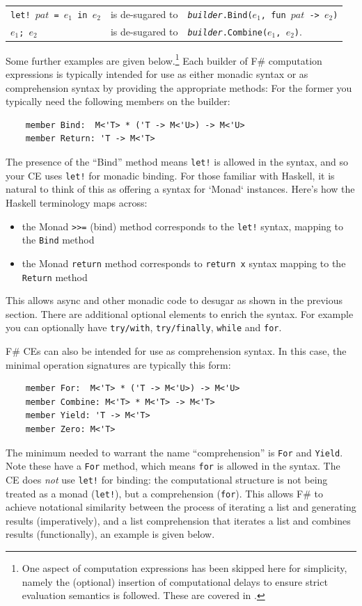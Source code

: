 \documentclass[acmsmall,screen]{acmart}
\begin{document}
\begin{center}
\centering
\begin{tabular}{lll}
\texttt{let! $pat$ = $e_1$ in $e_2$} & \textrm{is de-sugared to} & \texttt{\textit{builder}.Bind($e_1$, fun $pat$ -> $e_2$)} \\
\texttt{$e_1$; $e_2$} & \textrm{is de-sugared to} & \texttt{\textit{builder}.Combine($e_1$, $e_2$)}.
\end{tabular}
\end{center}

\noindent Some further examples are given below.\footnote{One aspect of computation expressions has been skipped here for simplicity, namely the (optional) insertion of computational delays to ensure strict evaluation semantics is followed.  These are covered in \citet{RefLangSpec}.} Each builder of F\# computation expressions is typically intended for use as either monadic syntax or as comprehension syntax by providing the appropriate methods:
For the former you typically need the following members on the builder:
\begin{verbatim}
    member Bind:  M<'T> * ('T -> M<'U>) -> M<'U>
    member Return: 'T -> M<'T>
\end{verbatim}
The presence of the ``Bind'' method means \texttt{let!} is allowed in the syntax, and so your CE uses \texttt{let!} for monadic binding. 
For those familiar with Haskell, it is natural to think of this as offering a syntax for `Monad`
instances.  Here’s how the Haskell terminology maps across:
\begin{itemize}
\item the Monad \texttt{>>=} (bind) method corresponds to the \texttt{let!} syntax, mapping to the \texttt{Bind} method
\item the Monad \texttt{return} method corresponds to \texttt{return x} syntax mapping to the \texttt{Return} method
\end{itemize}
This allows async and other monadic code to desugar as shown in the previous section. There are additional optional elements to enrich the syntax. For example you can optionally have
\texttt{try/with}, \texttt{try/finally}, \texttt{while} and \texttt{for}. 

F\# CEs can also be intended for use as comprehension syntax. In this case, the minimal operation signatures are typically this form:
\begin{verbatim}
    member For:  M<'T> * ('T -> M<'U>) -> M<'U>
    member Combine: M<'T> * M<'T> -> M<'T>
    member Yield: 'T -> M<'T>
    member Zero: M<'T>
\end{verbatim}
The minimum needed to warrant the name ``comprehension'' is \texttt{For} and \texttt{Yield}.
Note these have a \texttt{For} method, which means \texttt{for} is allowed in the syntax.
The CE does \emph{not} use \texttt{let!} for binding: the computational structure is not being treated as a monad (\texttt{let!}), but a comprehension (\texttt{for}).
This allows F\# to achieve notational
similarity between the process of iterating a list and generating results (imperatively), and
a list comprehension that iterates a list and combines results (functionally), an example is given below.
\end{document}
